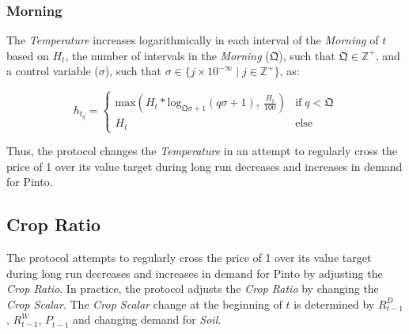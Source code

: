 \documentclass[tikz]{article}
\newcommand{\term}[1]{\textsl{#1}}
\newcommand{\Pinto}{} %
\begin{document}
\subsubsection{Morning}
\vspace{-0.025cm}

The \term{Temperature} increases logarithmically in each interval of the \term{Morning} of $t$ based on $H_{t}$, the number of intervals in the \term{Morning} ($\mathfrak{Q}$), such that $\mathfrak{Q} \in \mathbb{Z}^{+}$, and a control variable ($\sigma$), such that $\sigma \in \{j \times 10^{-\infty} \mid j \in \mathbb{Z}^{+} \}$, as:

\vspace{-0.025cm}

    $$ 
        h_{t_{q}} =
            \begin{cases}
                \text{max}(
                        H_{t}*\text{log}_{\mathfrak{Q}\sigma + 1}(q\sigma + 1),\ 
                        \frac{H_{t}}{100})
                    & \text{if} \; q < \mathfrak{Q} \\
                    
                H_{t} 
                    & \text{else}
            \end{cases} 
    $$

\vspace{-0.025cm}

Thus, the protocol changes the \term{Temperature} in an attempt to regularly cross the price of \Pinto1 over its value target during long run decreases and increases in demand for Pinto.


\vspace{-0.025cm}
\subsection{Crop Ratio}
\vspace{-0.025cm}

The protocol attempts to regularly cross the price of \Pinto1 over its value target during long run decreases and increases in demand for Pinto by adjusting the \term{Crop Ratio}. In practice, the protocol adjusts the \term{Crop Ratio} by changing the \term{Crop Scalar}. The \term{Crop Scalar} change at the beginning of $t$ is determined by $R_{t-1}^{D}$, $R_{t-1}^{W}$, $P_{\overline{t-1}}$ and changing demand for \term{Soil}. 

\vspace{-0.025cm}
\end{document}
